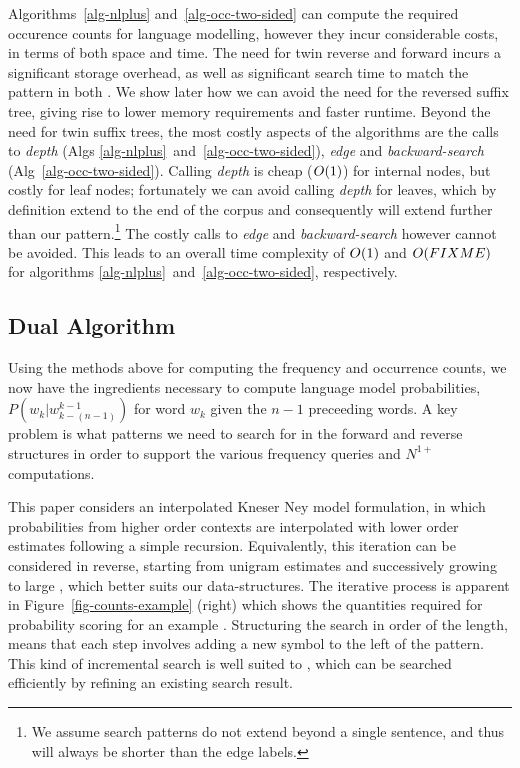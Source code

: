 Algorithms~\ref{alg-nlplus} and~\ref{alg-occ-two-sided} can compute the required occurence counts for \ngram language modelling, however they incur considerable costs, in terms of both space and time. 
The need for twin reverse and forward \CSTs incurs a significant storage overhead, as well as significant search time to match the pattern in both \CSTs. 
We show later how we can avoid the need for the reversed suffix  tree, giving rise to lower memory requirements and faster runtime. 
Beyond the need for twin suffix trees, the most costly aspects of the algorithms are the calls to \emph{depth} (Algs \ref{alg-nlplus}~and~\ref{alg-occ-two-sided}), \emph{edge} and \emph{backward-search} (Alg~\ref{alg-occ-two-sided}).
Calling \emph{depth} is cheap ($O(1)$) for internal nodes, but costly for leaf nodes; fortunately we can avoid calling \emph{depth} for leaves, which by definition extend to the end of the corpus and consequently will extend further than our pattern.\footnote{We assume search patterns do not extend beyond a single sentence, and thus will always be shorter than the edge labels.}
The costly calls to \emph{edge} and \emph{backward-search} however cannot be avoided.
This leads to an overall time complexity of $O(1)$ and $O(FIXME)$ for algorithms \ref{alg-nlplus}~and~\ref{alg-occ-two-sided}, respectively.

\subsection{Dual \CST Algorithm} 

Using the methods above for computing the frequency and occurrence
counts, we now have the ingredients necessary to compute \ngram language model
probabilities, $P(w_k | w^{k-1}_{k-(n-1)})$ for word $w_k$ given the $n-1$
preceeding words. A key problem is what patterns we need to search for
in the forward and reverse \CST structures in order to support the
various frequency queries and $N^{1+}$ computations. 

This paper considers an interpolated Kneser Ney model formulation, in which
probabilities from higher order contexts are interpolated with lower
order estimates following a simple recursion. 
Equivalently, this iteration can be considered in reverse, starting from unigram
estimates and successively growing to large \ngrams, which better
suits our \CST data-structures.
The iterative process is apparent in Figure~\ref{fig-counts-example} (right) which
shows the quantities required for probability scoring for an example \ngram.
Structuring the search in order of the \ngram length, means that each step involves adding a new symbol to the left of the pattern.
This kind of incremental search is well suited to \CSTs, which can be searched efficiently by refining an existing search result.


